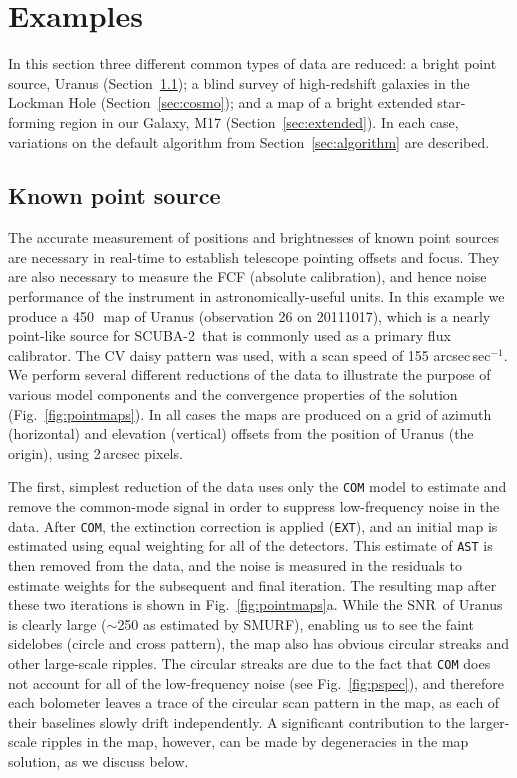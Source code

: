 \documentclass[useAMS,usenatbib,nofootinbib]{mn2e}
\newcommand{\snr}{SNR}
\newcommand{\scuba}{SCUBA-2}
\newcommand{\model}[1]{\texttt{#1}}
\begin{document}
\section{Examples}
\label{sec:examples}

In this section three different common types of data are reduced: a
bright point source, Uranus (Section~\ref{sec:point}); a blind survey
of high-redshift galaxies in the Lockman Hole
(Section~\ref{sec:cosmo}); and a map of a bright extended star-forming
region in our Galaxy, M17 (Section~\ref{sec:extended}). In each case,
variations on the default algorithm from Section~\ref{sec:algorithm}
are described.

\subsection{Known point source}
\label{sec:point}

The accurate measurement of positions and brightnesses of known point
sources are necessary in real-time to establish telescope pointing
offsets and focus. They are also necessary to measure the FCF
(absolute calibration), and hence noise performance of the instrument
in astronomically-useful units.  In this example we produce a 450\,\micron\ map
of Uranus (observation 26 on 20111017), which is a nearly point-like
source for \scuba\ that is commonly used as a primary flux
calibrator. The CV daisy pattern was used, with a scan speed of 155
arcsec\,sec$^{-1}$. We perform several different reductions of the
data to illustrate the purpose of various model components and the
convergence properties of the solution (Fig.~\ref{fig:pointmaps}). In
all cases the maps are produced on a grid of azimuth (horizontal) and
elevation (vertical) offsets from the position of Uranus (the origin),
using 2\,arcsec pixels.

The first, simplest reduction of the data uses only the \model{COM}
model to estimate and remove the common-mode signal in order to
suppress low-frequency noise in the data. After \model{COM}, the
extinction correction is applied (\model{EXT}), and an initial map is
estimated using equal weighting for all of the detectors. This
estimate of \model{AST} is then removed from the data, and the noise
is measured in the residuals to estimate weights for the subsequent
and final iteration. The resulting map after these two iterations is
shown in Fig.~\ref{fig:pointmaps}a. While the \snr\ of Uranus is
clearly large ($\sim$250 as estimated by SMURF), enabling us to see
the faint sidelobes (circle and cross pattern), the map also has
obvious circular streaks and other large-scale ripples. The circular
streaks are due to the fact that \model{COM} does not account for all
of the low-frequency noise (see Fig.~\ref{fig:pspec}), and therefore
each bolometer leaves a trace of the circular scan pattern in the map,
as each of their baselines slowly drift independently. A significant
contribution to the larger-scale ripples in the map, however, can be
made by degeneracies in the map solution, as we discuss below.
\end{document}
